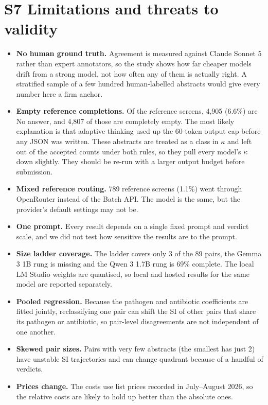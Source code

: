 \documentclass[11pt,a4paper]{article}
\begin{document}
\section{S7  Limitations and threats to validity}
\begin{itemize}
\item \textbf{No human ground truth.} Agreement is measured against Claude Sonnet 5 rather than expert annotators, so the study shows how far cheaper models drift from a strong model, not how often any of them is actually right. A stratified sample of a few hundred human-labelled abstracts would give every number here a firm anchor.
\item \textbf{Empty reference completions.} Of the reference screens, 4,905 (6.6\%) are No answer, and 4,807 of those are completely empty. The most likely explanation is that adaptive thinking used up the 60-token output cap before any JSON was written. These abstracts are treated as a class in $\kappa$ and left out of the accepted counts under both rules, so they pull every model's $\kappa$ down slightly. They should be re-run with a larger output budget before submission.
\item \textbf{Mixed reference routing.} 789 reference screens (1.1\%) went through OpenRouter instead of the Batch API. The model is the same, but the provider's default settings may not be.
\item \textbf{One prompt.} Every result depends on a single fixed prompt and verdict scale, and we did not test how sensitive the results are to the prompt.
\item \textbf{Size ladder coverage.} The ladder covers only 3 of the 89 pairs, the Gemma 3 1B rung is missing and the Qwen 3 1.7B rung is 69\% complete. The local LM Studio weights are quantised, so local and hosted results for the same model are reported separately.
\item \textbf{Pooled regression.} Because the pathogen and antibiotic coefficients are fitted jointly, reclassifying one pair can shift the SI of other pairs that share its pathogen or antibiotic, so pair-level disagreements are not independent of one another.
\item \textbf{Skewed pair sizes.} Pairs with very few abstracts (the smallest has just 2) have unstable SI trajectories and can change quadrant because of a handful of verdicts.
\item \textbf{Prices change.} The costs use list prices recorded in July--August 2026, so the relative costs are likely to hold up better than the absolute ones.
\end{itemize}
\end{document}
